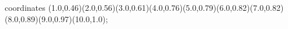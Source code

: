 					coordinates { (1.0,0.46)(2.0,0.56)(3.0,0.61)(4.0,0.76)(5.0,0.79)(6.0,0.82)(7.0,0.82)(8.0,0.89)(9.0,0.97)(10.0,1.0)};